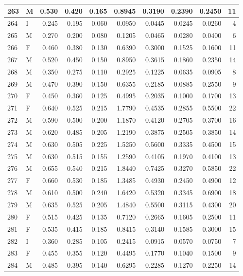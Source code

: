 \documentclass[9pt,twocolumn,twoside,]{pnas-new}
\begin{document}
\begin{tabular}{l|l|r|r|r|r|r|r|r|r}
\hline
263 & M & 0.530 & 0.420 & 0.165 & 0.8945 & 0.3190 & 0.2390 & 0.2450 & 11\\
\hline
264 & I & 0.245 & 0.195 & 0.060 & 0.0950 & 0.0445 & 0.0245 & 0.0260 & 4\\
\hline
265 & M & 0.270 & 0.200 & 0.080 & 0.1205 & 0.0465 & 0.0280 & 0.0400 & 6\\
\hline
266 & F & 0.460 & 0.380 & 0.130 & 0.6390 & 0.3000 & 0.1525 & 0.1600 & 11\\
\hline
267 & M & 0.520 & 0.450 & 0.150 & 0.8950 & 0.3615 & 0.1860 & 0.2350 & 14\\
\hline
268 & M & 0.350 & 0.275 & 0.110 & 0.2925 & 0.1225 & 0.0635 & 0.0905 & 8\\
\hline
269 & M & 0.470 & 0.390 & 0.150 & 0.6355 & 0.2185 & 0.0885 & 0.2550 & 9\\
\hline
270 & F & 0.450 & 0.360 & 0.125 & 0.4995 & 0.2035 & 0.1000 & 0.1700 & 13\\
\hline
271 & F & 0.640 & 0.525 & 0.215 & 1.7790 & 0.4535 & 0.2855 & 0.5500 & 22\\
\hline
272 & M & 0.590 & 0.500 & 0.200 & 1.1870 & 0.4120 & 0.2705 & 0.3700 & 16\\
\hline
273 & M & 0.620 & 0.485 & 0.205 & 1.2190 & 0.3875 & 0.2505 & 0.3850 & 14\\
\hline
274 & M & 0.630 & 0.505 & 0.225 & 1.5250 & 0.5600 & 0.3335 & 0.4500 & 15\\
\hline
275 & M & 0.630 & 0.515 & 0.155 & 1.2590 & 0.4105 & 0.1970 & 0.4100 & 13\\
\hline
276 & M & 0.655 & 0.540 & 0.215 & 1.8440 & 0.7425 & 0.3270 & 0.5850 & 22\\
\hline
277 & F & 0.660 & 0.530 & 0.185 & 1.3485 & 0.4930 & 0.2450 & 0.4900 & 12\\
\hline
278 & M & 0.610 & 0.500 & 0.240 & 1.6420 & 0.5320 & 0.3345 & 0.6900 & 18\\
\hline
279 & M & 0.635 & 0.525 & 0.205 & 1.4840 & 0.5500 & 0.3115 & 0.4300 & 20\\
\hline
280 & F & 0.515 & 0.425 & 0.135 & 0.7120 & 0.2665 & 0.1605 & 0.2500 & 11\\
\hline
281 & F & 0.535 & 0.415 & 0.185 & 0.8415 & 0.3140 & 0.1585 & 0.3000 & 15\\
\hline
282 & I & 0.360 & 0.285 & 0.105 & 0.2415 & 0.0915 & 0.0570 & 0.0750 & 7\\
\hline
283 & F & 0.455 & 0.355 & 0.120 & 0.4495 & 0.1770 & 0.1040 & 0.1500 & 9\\
\hline
284 & M & 0.485 & 0.395 & 0.140 & 0.6295 & 0.2285 & 0.1270 & 0.2250 & 14\\

\end{tabular}
\end{document}
